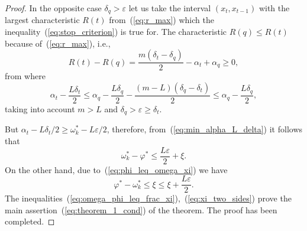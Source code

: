 \documentclass[preprint]{elsarticle}
\begin{document}
\begin{proof}
  In the opposite case $\delta_q > \varepsilon$ let us take the interval $(x_t, x_{t - 1})$ with the largest characteristic $R(t)$ from~(\ref{eq:r_max}) which the inequality~(\ref{eq:stop_criterion}) is true for. The characteristic $R(q) \leq R(t)$ because of~(\ref{eq:r_max}), i.e.,
  \begin{equation}
    R(t) - R(q) = \frac{m(\delta_t - \delta_q)}{2} - \alpha_t + \alpha_q \geq 0,
  \end{equation}
  from where
  \begin{equation}
    \alpha_t - \frac{L \delta_t}{2} \leq \alpha_q - \frac{L \delta_q}{2} - \frac{(m - L)(\delta_q - \delta_t)}{2} \leq \alpha_q -\frac{L \delta_q}{2},
  \end{equation}
  taking into account $m > L$ and $\delta_q > \varepsilon \geq \delta_t$.

  But $\alpha_t - L \delta_t / 2 \geq \omega_k^* - L \varepsilon / 2$, therefore, from~(\ref{eq:min_alpha_L_delta}) it follows that
  \begin{equation}
    \label{eq:omega_phi_leq_frac_xi}
    \omega_k^* - \varphi^* \leq \frac{L \varepsilon}{2} + \xi.
  \end{equation}
  On the other hand, due to~(\ref{eq:phi_leq_omega_xi}) we have
  \begin{equation}
    \label{eq:xi_two_sides}
    \varphi^* - \omega_k^* \leq \xi \leq \xi + \frac{L \varepsilon}{2}.
  \end{equation}
  The inequalities~(\ref{eq:omega_phi_leq_frac_xi}),~(\ref{eq:xi_two_sides}) prove the main assertion~(\ref{eq:theorem_1_cond}) of the theorem. The proof has been completed.
\end{proof}
\end{document}
